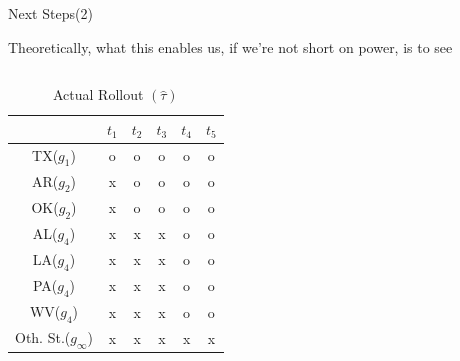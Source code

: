 \documentclass[12pt,  aspectratio=169]{beamer}    %
\begin{document}
\begin{frame}{Next  Steps(2)}

Theoretically,  what  this  enables  us,  if  we're  not  short  on  power,  is  to  see  

\begin{columns}

    \begin{table}[h]
        \centering
        \tiny
        \begin{tabular}{|c|c|c|c|c|c|}
        \hline
              &$t_1$&$t_2$&$t_3$&$t_4$&$t_5$  \\  \hline
              TX($g_1$)&\textcolor{red!60}{o}&\textcolor{red!60}{o}&\textcolor{red!60}{o}&\textcolor{red!60}{o}&\textcolor{red!60}{o}  \\  \hline
              AR($g_2$)&x&\textcolor{red!60}{o}&\textcolor{red!60}{o}&\textcolor{red!60}{o}&\textcolor{red!60}{o}  \\  \hline
              OK($g_2$)&x&\textcolor{red!60}{o}&\textcolor{red!60}{o}&\textcolor{red!60}{o}&\textcolor{red!60}{o}  \\  \hline
              AL($g_4$)&x&x&x&\textcolor{red!60}{o}&\textcolor{red!60}{o}  \\  \hline
              LA($g_4$)&x&x&x&\textcolor{red!60}{o}&\textcolor{red!60}{o}  \\  \hline
              PA($g_4$)&x&x&x&\textcolor{red!60}{o}&\textcolor{red!60}{o}  \\  \hline
              WV($g_4$)&x&x&x&\textcolor{red!60}{o}&\textcolor{red!60}{o}  \\  \hline
              Oth.  St.($g_\infty$)&x&x&x&x&x  \\  \hline
        \end{tabular}
        \caption{\footnotesize  Actual  Rollout  $(\hat\tau)$}
    \end{table}


\end{columns}
\end{frame}
\end{document}
